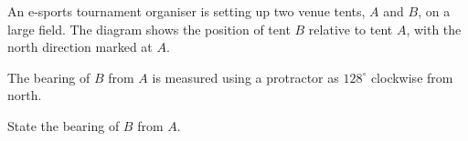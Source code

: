 \begin{question}
\noindent An e-sports tournament organiser is setting up two venue tents, $A$ and $B$, on a large field. The diagram shows the position of tent $B$ relative to tent $A$, with the north direction marked at $A$.

\begin{center}
\end{center}

\noindent The bearing of $B$ from $A$ is measured using a protractor as $128^\circ$ clockwise from north.

\noindent State the bearing of $B$ from $A$.

\vspace{4cm}
\begin{flushright}
\end{flushright}
\end{question}